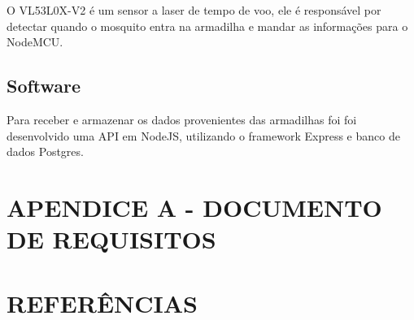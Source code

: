 \documentclass[
	12pt,				%
	openright,			%
	oneside,			%
	a4paper,			%
	chapter=TITLE,		%
	english,			%
	brazil				%
	]{abntex2}
\begin{document}
O VL53L0X-V2 é um sensor a laser de tempo de voo, ele é responsável por detectar quando o mosquito entra na armadilha e mandar as informações para o NodeMCU.

\section{\textbf{Software}}

Para receber e armazenar os dados provenientes das armadilhas foi foi desenvolvido uma API em NodeJS, utilizando o framework Express e banco de dados Postgres. 


\chapter*{APENDICE A - DOCUMENTO DE REQUISITOS}




\chapter*{REFERÊNCIAS}
\renewcommand{\bibsection}{}




\printindex

\end{document}
